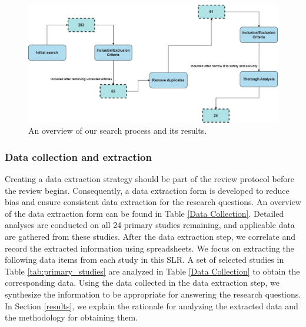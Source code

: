 \documentclass[a4paper,12pt]{article}
\begin{document}
\begin{figure}[H]
\centering
\includegraphics*[width=1.1\columnwidth]{img/search process}
\caption{An overview of our search process and its results.}   
\label{fig:search process}
 \end{figure}



\subsubsection{Data collection and extraction}
\label{sec:Data collection and extraction}


\hspace{5mm} Creating a data extraction strategy should be part of the review protocol before the review begins. Consequently, a data extraction form is developed to reduce bias and ensure consistent data extraction for the research questions. An overview of the data extraction form can be found in Table \ref{Data Collection}. Detailed analyses are conducted on all 24 primary studies remaining, and applicable data are gathered from these studies. After the data extraction step, we correlate and record the extracted information using spreadsheets. We focus on extracting the following data items from each study in this SLR. A set of selected studies in Table \ref{tab:primary_studies} are analyzed in Table \ref{Data Collection} to obtain the corresponding data. Using the data collected in the data extraction step, we synthesize the information to be appropriate for answering the research questions. In Section \ref{results}, we explain the rationale for analyzing the extracted data and the methodology for obtaining them.
\end{document}
